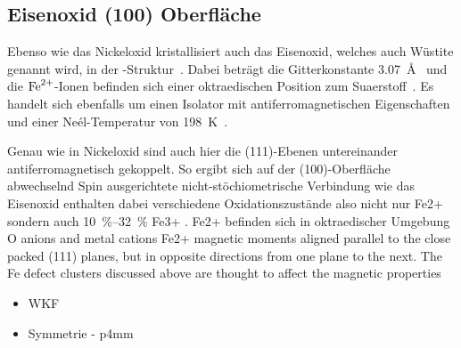         \subsection{Eisenoxid (100) Oberfläche}
            Ebenso wie das Nickeloxid kristallisiert auch das Eisenoxid, welches auch Wüstite genannt wird, in der -Struktur~\cite{FeO_4}.
            Dabei beträgt die Gitterkonstante \SI{3.07}{\angstrom}~\cite{FeO_1} und die $\ce{Fe}^{2+}$-Ionen befinden sich einer oktraedischen Position zum Suaerstoff~\cite{FeO_4}.
            Es handelt sich ebenfalls um einen Isolator mit antiferromagnetischen Eigenschaften und einer Neél-Temperatur von \SI{198}{\kelvin}~\cite{FeO_4}.

            Genau wie in Nickeloxid sind auch hier die (111)-Ebenen untereinander antiferromagnetisch gekoppelt.
            So ergibt sich auf der (100)-Oberfläche abwechselnd Spin ausgerichtete
            nicht-stöchiometrische Verbindung wie das Eisenoxid enthalten dabei verschiedene Oxidationszustände also nicht nur Fe2+ sondern auch \SIrange{10}{32}{\percent} Fe3+ \cite{FeO_11}.
            Fe2+ befinden sich in oktraedischer Umgebung
            O anions and metal cations
            Fe2+ magnetic moments aligned parallel to the close packed (111) planes, but in opposite directions from one plane to the next. The Fe defect clusters discussed above are thought to affect the magnetic properties 

            \begin{itemize}
                \item WKF
                \item Symmetrie - p4mm
            \end{itemize}


